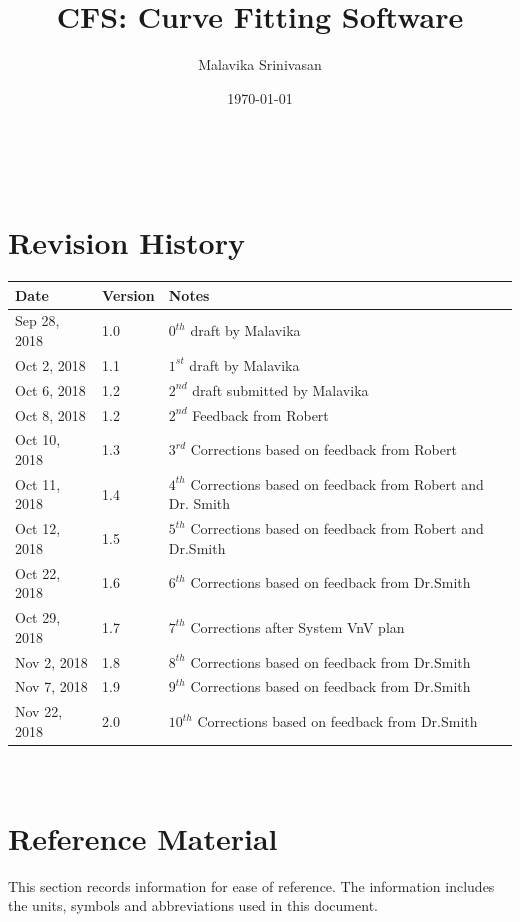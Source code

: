 \documentclass[12pt]{article}
\begin{document}
\title{CFS: Curve Fitting Software} 
\author{Malavika Srinivasan}
\date{\today}

\maketitle

~\newpage


\section{Revision History}

\begin{tabularx}{\textwidth}{p{3cm}p{2cm}X}
\toprule {\bf Date} & {\bf Version} & {\bf Notes}\\
\midrule
Sep 28, 2018 & 1.0 & $0^{th}$ draft by Malavika\\
Oct 2, 2018 & 1.1 & $1^{st}$ draft by Malavika\\
Oct 6, 2018 & 1.2 & $2^{nd}$ draft submitted by Malavika\\
Oct 8, 2018 & 1.2 & $2^{nd}$ Feedback from Robert\\
Oct 10, 2018 & 1.3 & $3^{rd}$ Corrections based on feedback from Robert\\
Oct 11, 2018 & 1.4 & $4^{th}$ Corrections based on feedback from Robert and Dr. Smith\\
Oct 12, 2018 & 1.5 & $5^{th}$ Corrections based on feedback from Robert and Dr.Smith\\
Oct 22, 2018 & 1.6 & $6^{th}$ Corrections based on feedback from Dr.Smith\\
Oct 29, 2018 & 1.7 & $7^{th}$ Corrections after System VnV plan\\
Nov 2, 2018 & 1.8 & $8^{th}$ Corrections based on feedback from Dr.Smith\\
Nov 7, 2018 & 1.9 & $9^{th}$ Corrections based on feedback from Dr.Smith\\
Nov 22, 2018 & 2.0 & $10^{th}$ Corrections based on feedback from Dr.Smith\\
\bottomrule
\end{tabularx}

~\newpage
	
\section{Reference Material}

This section records information for ease of reference. The information includes the units, symbols and abbreviations used in this document.
\end{document}
